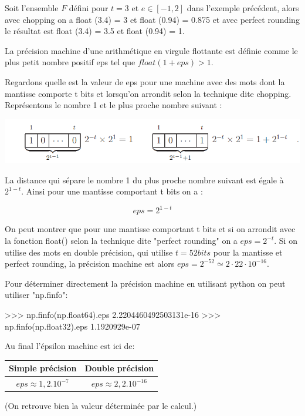 \documentclass[10pt,fleqn]{article} %
\begin{document}
\begin{exemple}
Soit l'ensemble $F$ défini pour $t = 3$ et $e \in [-1, 2]$ dans l'exemple précédent,
alors avec chopping on a float (3.4) = 3 et float (0.94) = 0.875 et avec perfect rounding
le résultat est float (3.4) = 3.5 et float (0.94) = 1.
\end{exemple}


\begin{defi}
La précision machine d'une arithmétique en virgule flottante est définie comme le
plus petit nombre positif eps tel que
$float (1 + eps) > 1 $.
\end{defi}


Regardons quelle est la valeur de eps pour une machine avec des mots dont la
mantisse comporte t bits et lorsqu’on arrondit selon la technique dite chopping.
Représentons le nombre 1 et le plus proche nombre suivant :

\begin{center}
\includegraphics[width=.5\textwidth]{images/eps6.png}
\label{}
\end{center}

La distance qui sépare le nombre 1 du plus proche nombre suivant est égale à $2^{1-t}$.
Ainsi pour une mantisse comportant t bits on a :

$$eps= 2^{1-t}$$

On peut montrer que  pour une mantisse comportant t bits et si on arrondit avec la fonction float() selon la technique dite "perfect rounding" on a $eps =2^{-t}$.
Si on utilise des mots en double précision, qui utilise $t = 52 bits$ pour la mantisse et perfect rounding, la précision machine est alors $eps = 2 ^{-52} \simeq 2\cdot 22 \cdot 10^{-16}$.


Pour déterminer directement la précision machine en utilisant python on peut utiliser "np.finfo":

\begin{minipage}[c]{.4\linewidth}
\begin{py}
\begin{python}
>>> np.finfo(np.float64).eps
2.2204460492503131e-16
>>> np.finfo(np.float32).eps
1.1920929e-07
\end{python}
\end{py}
\end{minipage} \hfill
\begin{minipage}[c]{.5\linewidth}

Au final l'épsilon machine est ici de:
\begin{center}
\begin{tabular}{|c|c|}
\hline
Simple précision & Double précision \\
\hline
$eps \approx 1,2.10^{-7}$ & $eps \approx 2,2 . 10^{-16}$ \\
\hline
\end{tabular}
\end{center}

(On retrouve bien la valeur déterminée par le calcul.)

\end{minipage}
\end{document}
